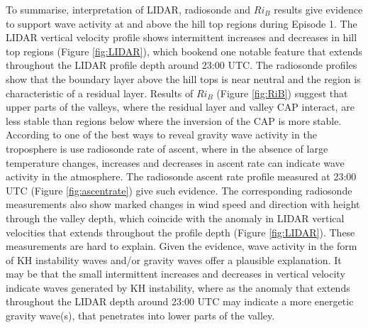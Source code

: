 \documentclass[times]{qjrms4}
\begin{document}
To summarise, interpretation of LIDAR, radiosonde and $Ri_B$ results give evidence to support wave activity at and above the hill top regions during Episode 1. The LIDAR vertical velocity profile shows intermittent increases and decreases in hill top regions (Figure \ref{fig:LIDAR}), which bookend one notable feature that extends throughout the LIDAR profile depth around 23:00 UTC. The radiosonde profiles show that the boundary layer above the hill tops is near neutral and the region is characteristic of a residual layer. Results of $Ri_B$ (Figure \ref{fig:RiB}) suggest that upper parts of the valleys, where the residual layer and valley CAP interact, are less stable than regions below where the inversion of the CAP is more stable. According to \citet{lalas1980tropospheric} one of the best ways to reveal gravity wave activity in the troposphere is use radiosonde rate of ascent, where in the absence of large temperature changes, increases and decreases in ascent rate can indicate wave activity in the atmosphere. The radiosonde ascent rate profile measured at 23:00 UTC (Figure \ref{fig:ascentrate}) give such evidence. The corresponding radiosonde measurements also show marked changes in wind speed and direction with height through the valley depth, which coincide with the anomaly in LIDAR vertical velocities that extends throughout the profile depth (Figure \ref{fig:LIDAR}). These measurements are hard to explain. Given the evidence, wave activity in the form of KH instability waves and/or gravity waves offer a plausible explanation. It may be that the small intermittent increases and decreases in vertical velocity indicate waves generated by KH instability, where as the anomaly that extends throughout the LIDAR depth around 23:00 UTC may indicate a more energetic gravity wave(s), that penetrates into lower parts of the valley.
%
%
\end{document}
